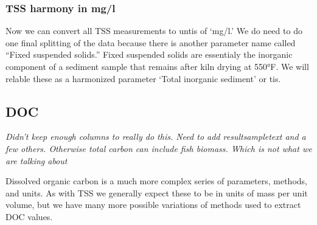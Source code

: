 \documentclass[]{article}
\newenvironment{Shaded}{\begin{snugshade}}{\end{snugshade}}
\newcommand{\CommentTok}[1]{\textcolor[rgb]{0.56,0.35,0.01}{\textit{#1}}}
\newcommand{\DataTypeTok}[1]{\textcolor[rgb]{0.13,0.29,0.53}{#1}}
\newcommand{\KeywordTok}[1]{\textcolor[rgb]{0.13,0.29,0.53}{\textbf{#1}}}
\newcommand{\NormalTok}[1]{#1}
\newcommand{\OperatorTok}[1]{\textcolor[rgb]{0.81,0.36,0.00}{\textbf{#1}}}
\newcommand{\StringTok}[1]{\textcolor[rgb]{0.31,0.60,0.02}{#1}}
\begin{document}
\hypertarget{tss-harmony-in-mgl}{%
\subsubsection{TSS harmony in mg/l}\label{tss-harmony-in-mgl}}

Now we can convert all TSS measurements to untis of `mg/l.' We do need
to do one final splitting of the data because there is another parameter
name called ``Fixed suspended solids.'' Fixed suspended solids are
essentialy the inorganic component of a sediment sample that remains
after kiln drying at 550°F. We will relable these as a harmonized
parameter `Total inorganic sediment' or tis.

\begin{Shaded}
\end{Shaded}

\hypertarget{doc}{%
\subsection{DOC}\label{doc}}

\emph{Didn't keep enough columns to really do this. Need to add
resultsampletext and a few others. Otherwise total carbon can include
fish biomass. Which is not what we are talking about}

Dissolved organic carbon is a much more complex series of parameters,
methods, and units. As with TSS we generally expect these to be in units
of mass per unit volume, but we have many more possible variations of
methods used to extract DOC values.
\end{document}
